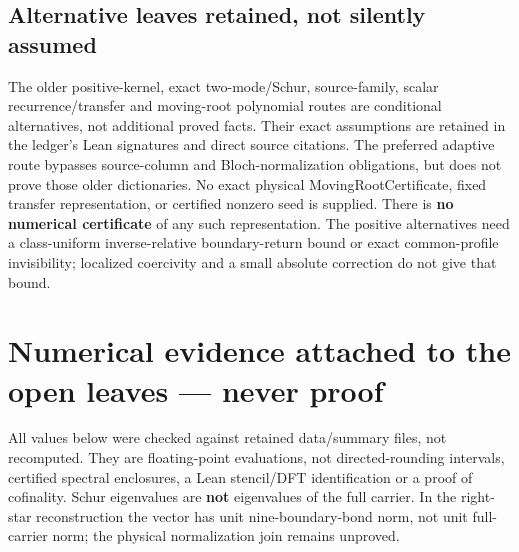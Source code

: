 \subsection{Alternative leaves retained, not silently assumed}

The older positive-kernel, exact two-mode/Schur, source-family, scalar recurrence/transfer and moving-root polynomial routes are conditional alternatives, not additional proved facts. Their exact assumptions are retained in the ledger's Lean signatures and direct source citations. The preferred adaptive route bypasses source-column and Bloch-normalization obligations, but does not prove those older dictionaries. No exact physical MovingRootCertificate, fixed transfer representation, or certified nonzero seed is supplied. There is \textbf{no numerical certificate} of any such representation. The positive alternatives need a class-uniform inverse-relative boundary-return bound or exact common-profile invisibility; localized coercivity and a small absolute correction do not give that bound.

\section{Numerical evidence attached to the open leaves — never proof}

All values below were checked against retained data/summary files, not recomputed. They are floating-point evaluations, not directed-rounding intervals, certified spectral enclosures, a Lean stencil/DFT identification or a proof of cofinality. Schur eigenvalues are \textbf{not} eigenvalues of the full carrier. In the right-star reconstruction the vector has unit nine-boundary-bond norm, not unit full-carrier norm; the physical normalization join remains unproved.

